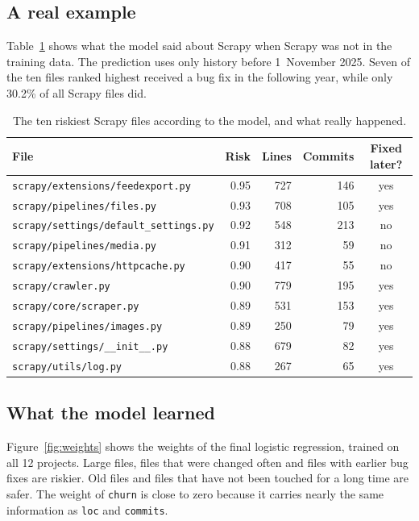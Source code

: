 \documentclass[11pt,a4paper]{article}
\begin{document}
\subsection{A real example}

Table~\ref{tab:example} shows what the model said about Scrapy when Scrapy was
not in the training data. The prediction uses only history before 1~November
2025. Seven of the ten files ranked highest received a bug fix in the
following year, while only 30.2\% of all Scrapy files did.

\begin{table}[h]
\centering
\begin{tabular}{lrrrc}
\toprule
File & Risk & Lines & Commits & Fixed later? \\
\midrule
\texttt{scrapy/extensions/feedexport.py} & 0.95 & 727 & 146 & yes \\
\texttt{scrapy/pipelines/files.py} & 0.93 & 708 & 105 & yes \\
\texttt{scrapy/settings/default\_settings.py} & 0.92 & 548 & 213 & no \\
\texttt{scrapy/pipelines/media.py} & 0.91 & 312 & 59 & no \\
\texttt{scrapy/extensions/httpcache.py} & 0.90 & 417 & 55 & no \\
\texttt{scrapy/crawler.py} & 0.90 & 779 & 195 & yes \\
\texttt{scrapy/core/scraper.py} & 0.89 & 531 & 153 & yes \\
\texttt{scrapy/pipelines/images.py} & 0.89 & 250 & 79 & yes \\
\texttt{scrapy/settings/\_\_init\_\_.py} & 0.88 & 679 & 82 & yes \\
\texttt{scrapy/utils/log.py} & 0.88 & 267 & 65 & yes \\
\bottomrule
\end{tabular}
\caption{The ten riskiest Scrapy files according to the model, and what really happened.}
\label{tab:example}
\end{table}

\subsection{What the model learned}

Figure~\ref{fig:weights} shows the weights of the final logistic regression,
trained on all 12 projects. Large files, files that were changed often and
files with earlier bug fixes are riskier. Old files and files that have not
been touched for a long time are safer. The weight of \texttt{churn} is close
to zero because it carries nearly the same information as \texttt{loc} and
\texttt{commits}.
\end{document}
